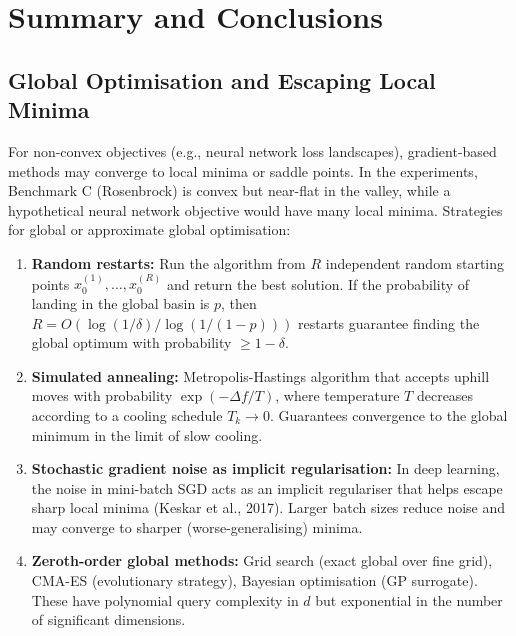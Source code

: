 \documentclass[11pt,a4paper]{article}
\theoremstyle{definition}
\begin{document}
\section{Summary and Conclusions}
\label{sec:conclusion}

\subsection{Global Optimisation and Escaping Local Minima}

For non-convex objectives (e.g., neural network loss landscapes), gradient-based methods may converge to local minima or saddle points. In the experiments, Benchmark C (Rosenbrock) is convex but near-flat in the valley, while a hypothetical neural network objective would have many local minima. Strategies for global or approximate global optimisation:

\begin{enumerate}
\item \textbf{Random restarts:} Run the algorithm from $R$ independent random starting points $x_0^{(1)}, \ldots, x_0^{(R)}$ and return the best solution. If the probability of landing in the global basin is $p$, then $R = O(\log(1/\delta)/\log(1/(1-p)))$ restarts guarantee finding the global optimum with probability $\geq 1-\delta$.

\item \textbf{Simulated annealing:} Metropolis-Hastings algorithm that accepts uphill moves with probability $\exp(-\Delta f / T)$, where temperature $T$ decreases according to a cooling schedule $T_k \to 0$. Guarantees convergence to the global minimum in the limit of slow cooling.

\item \textbf{Stochastic gradient noise as implicit regularisation:} In deep learning, the noise in mini-batch SGD acts as an implicit regulariser that helps escape sharp local minima (Keskar et al., 2017). Larger batch sizes reduce noise and may converge to sharper (worse-generalising) minima.

\item \textbf{Zeroth-order global methods:} Grid search (exact global over fine grid), CMA-ES (evolutionary strategy), Bayesian optimisation (GP surrogate). These have polynomial query complexity in $d$ but exponential in the number of significant dimensions.
\end{enumerate}
\end{document}
